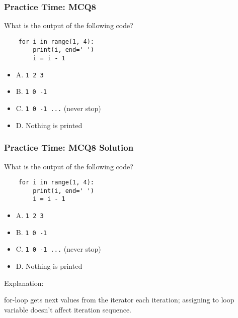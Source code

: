 \documentclass{beamer}
\begin{document}
\begin{frame}[fragile]
    \frametitle{Practice Time: MCQ8}
    What is the output of the following code?
    \begin{verbatim}
    for i in range(1, 4):
        print(i, end=' ')
        i = i - 1
    \end{verbatim}
    \begin{itemize}
        \item A. \texttt{1 2 3}
        \item B. \texttt{1 0 -1}
        \item C. \texttt{1 0 -1 ...} (never stop)
        \item D. Nothing is printed
    \end{itemize}
\end{frame}
\begin{frame}[fragile]
    \frametitle{Practice Time: MCQ8 Solution}
    What is the output of the following code?
    \begin{verbatim}
    for i in range(1, 4):
        print(i, end=' ')
        i = i - 1
    \end{verbatim}
    \begin{itemize}
        \item \alert{A. \texttt{1 2 3}}
        \item B. \texttt{1 0 -1}
        \item C. \texttt{1 0 -1 ...} (never stop)
        \item D. Nothing is printed
    \end{itemize}

    Explanation:

    for-loop gets next values from the iterator each iteration;
    assigning to loop variable doesn't affect iteration sequence.
\end{frame}
\end{document}
